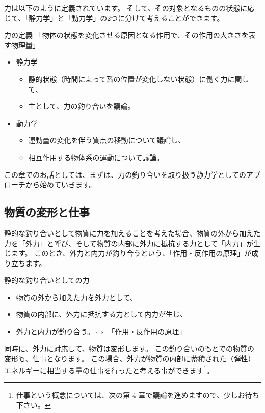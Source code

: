 \documentclass[uplatex,dvipdfmx,a4paper,11pt]{jsreport}
\begin{document}
力は以下のように定義されています。
そして、その対象となるものの状態に応じて、「静力学」と「動力学」の2つに分けて考えることができます。
\large
	\begin{itembox}[l]{力の定義}
		「物体の状態を変化させる原因となる作用で、その作用の大きさを表す物理量」
		\begin{itemize}
			\item 静力学
			\begin{itemize}
				\item 静的状態（時間によって系の位置が変化しない状態）に働く力に関して、
				\item 主として、力の釣り合いを議論。
			\end{itemize}
			\item 動力学
			\begin{itemize}
				\item 運動量の変化を伴う質点の移動について議論し、
				\item 相互作用する物体系の運動について議論。
			\end{itemize}
		\end{itemize}
	\end{itembox}
\normalsize

この章でのお話としては、まずは、力の釣り合いを取り扱う静力学としてのアプローチから始めていきます。

\subsection{物質の変形と仕事}

静的な釣り合いとして物質に力を加えることを考えた場合、物質の外から加えた力を「外力」と呼び、そして物質の内部に外力に抵抗する力として「内力」が生じます。
このとき、外力と内力が釣り合うという、「作用・反作用の原理」が成り立ちます。
\large
	\begin{itembox}[l]{静的な釣り合いとしての力}
		\begin{itemize}
			\item 物質の外から加えた力を外力として、
			\item 物質の内部に、外力に抵抗する力として内力が生じ、
			\item 外力と内力が釣り合う。$\Leftrightarrow$ 「作用・反作用の原理」
		\end{itemize}
	\end{itembox}
\normalsize

同時に、外力に対応して、物質は変形します。
この釣り合いのもとでの物質の変形も、仕事となります。
この場合、外力が物質の内部に蓄積された（弾性）エネルギーに相当する量の仕事を行ったと考える事ができます\footnote{
	仕事という概念については、次の第 4 章で議論を進めますので、少しお待ち下さい。
}。
\end{document}
